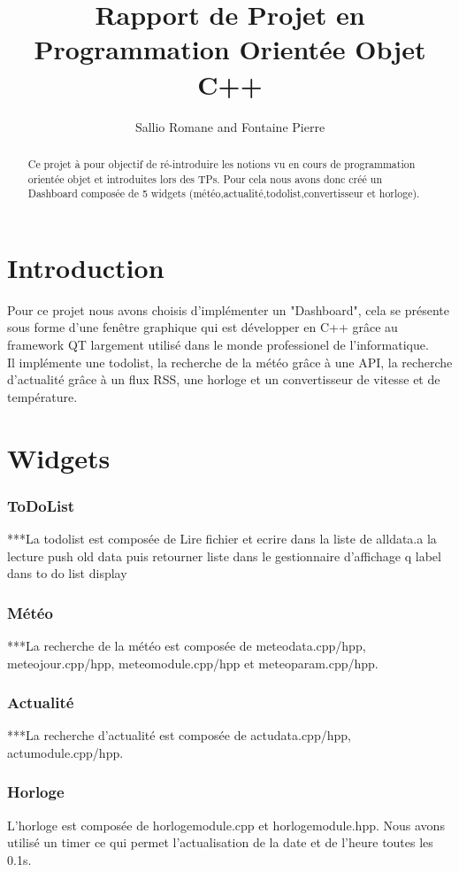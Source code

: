 \documentclass[12pt]{report}
\title{Rapport de Projet en Programmation Orientée Objet C++}
\author{Sallio Romane and Fontaine Pierre}
\begin{document}
  \maketitle
  \newpage
  \tableofcontents
  \begin{abstract}
    Ce projet à pour objectif de ré-introduire les notions vu en cours de programmation orientée objet et introduites lors des TPs. Pour cela nous avons donc créé un Dashboard composée de 5 widgets (météo,actualité,todolist,convertisseur et horloge).  
  \end{abstract}
  \newpage
  \part{Introduction}
    Pour ce projet nous avons choisis d'implémenter un "Dashboard", cela se présente sous forme d'une fenêtre graphique qui est développer en C++ grâce au framework QT largement utilisé dans le monde professionel de l'informatique.\\
    Il implémente une todolist, la recherche de la météo grâce à une API, la recherche d'actualité grâce à un flux RSS, une horloge et un convertisseur de vitesse et de température.
  \part{Widgets}
  \section{ToDoList}
    ***La todolist est composée de  
	Lire fichier et ecrire dans la liste de alldata.a la lecture push old data puis retourner liste dans le gestionnaire d'affichage q label dans to do list display
  \section{Météo}
    ***La recherche de la météo est composée de meteodata.cpp/hpp, meteojour.cpp/hpp, meteomodule.cpp/hpp et meteoparam.cpp/hpp.
  \section{Actualité}
    ***La recherche d'actualité est composée de actudata.cpp/hpp, actumodule.cpp/hpp.
  \section{Horloge}
    L'horloge est composée de horlogemodule.cpp et horlogemodule.hpp. Nous avons utilisé un timer ce qui permet l'actualisation de la date et de l'heure toutes les 0.1s.\\
\end{document}
